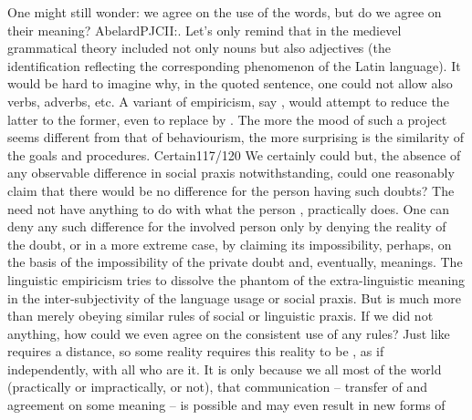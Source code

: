 One might still wonder: we agree on the use of the words, but do we agree on
their meaning?  \citet{With most names, we've come to know which things they go
  together with from their use in speech, although we are unable to determine
  what the correct meaning or understanding of them is.}{AbelardPJC}{II:. Let's only remind that in the medievel grammatical theory 
  included not only nouns but also adjectives (the identification reflecting the
  corresponding phenomenon of the Latin language). It would be hard to imagine
  why, in the quoted sentence, one could not allow also verbs, adverbs,
  etc.\label{ftnt:latinNames}} A variant of empiricism, say , would attempt to reduce the latter to the former, even to replace
 by .  The more the mood of such a project seems different
from that of behaviourism, the more surprising is the similarity of the goals
and procedures.  \citet{Why is it not possible for me to doubt that I have never
  been on the moon? [...]  But if anyone were to doubt it, how would his doubt
  come out in practice?  And couldn't we peacefully leave him to doubt it, since
  it makes no difference at all?}{Certain}{117/120} We certainly could but, the
absence of any observable difference in social praxis notwithstanding, could one
reasonably claim that there would be no difference for the person having such
doubts? The  need not have anything to do with
what the person , practically does.  One can deny any such
difference for the involved person only by denying the reality of the doubt, or
in a more extreme case, by claiming its impossibility, perhaps, on the basis of
the impossibility of the private doubt and, eventually, meanings. The linguistic
empiricism tries to dissolve the phantom of the extra-linguistic meaning in the
inter-subjectivity of the language usage or social praxis.  But  is
much more than merely obeying similar rules of social or linguistic praxis. If
we did not  anything, how could we even agree on the consistent use of
any rules? Just like  requires a distance, so  some
reality requires this reality to be , as if independently, with all
who are  it. It is only because we all
 most of the world (practically or impractically,  or
not), that  communication -- transfer of and agreement on some
meaning -- is possible and may even result in new forms of
